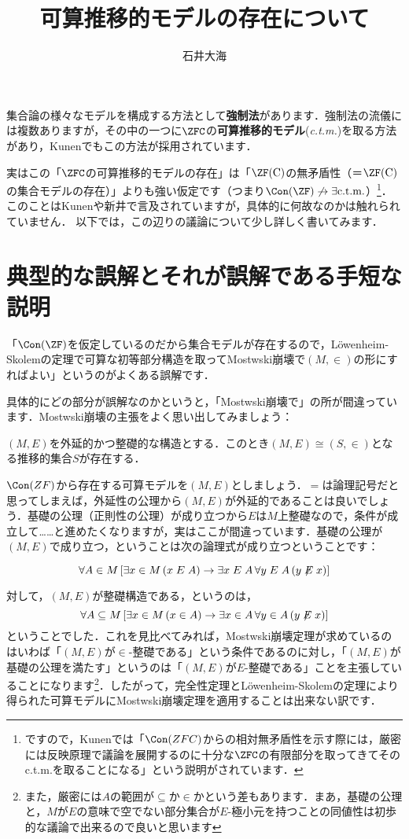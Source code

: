 \documentclass[a4j,uplatex,dvipdfmx]{jsarticle}
\title{可算推移的モデルの存在について}
\author{石井大海}
\begin{document}
\maketitle

集合論の様々なモデルを構成する方法として\textbf{強制法}があります．強制法の流儀には複数ありますが，その中の一つに$\ZFC$の\textbf{可算推移的モデル}(\textit{c.t.m.})を取る方法があり，Kunen\cite{Kunen:2011}でもこの方法が採用されています．

実はこの「$\ZFC$の可算推移的モデルの存在」は「$\ZF(\mathrm{C})$の無矛盾性（＝$\ZF(\mathrm{C})$の集合モデルの存在）」よりも強い仮定です（つまり$\Con(\ZF) \not\rightarrow \exists \text{c.t.m.}$）\footnote{ですので，Kunenでは「$\Con(ZFC)$からの相対無矛盾性を示す際には，厳密には反映原理で議論を展開するのに十分な$\ZFC$の有限部分を取ってきてそのc.t.m.を取ることになる」という説明がされています．}．このことはKunen\cite{Kunen:2011}や新井\cite{Arai:2011}で言及されていますが，具体的に何故なのかは触れられていません．
以下では，この辺りの議論について少し詳しく書いてみます．

\section{典型的な誤解とそれが誤解である手短な説明}
「$\Con(\ZF)$を仮定しているのだから集合モデルが存在するので，L\"{o}wenheim-Skolemの定理で可算な初等部分構造を取ってMostwski崩壊で$(M, \in)$の形にすればよい」というのがよくある誤解です．

具体的にどの部分が誤解なのかというと，「Mostwski崩壊で」の所が間違っています．Mostwski崩壊の主張をよく思い出してみましょう：

\begin{theorem}[Mostwski]
 $(M, E)$を外延的かつ整礎的な構造とする．このとき$(M, E) \cong (S, \in)$となる推移的集合$S$が存在する．
\end{theorem}

$\Con(ZF)$から存在する可算モデルを$(M, E)$としましょう．$=$は論理記号だと思ってしまえば，外延性の公理から$(M, E)$が外延的であることは良いでしょう．基礎の公理（正則性の公理）が成り立つから$E$は$M$上整礎なので，条件が成立して……と進めたくなりますが，実はここが間違っています．基礎の公理が$(M, E)$で成り立つ，ということは次の論理式が成り立つということです：

\[
 \forall A \in M\, [\exists x \in M\,(x \mathrel{E} A) \rightarrow \exists x \mathrel{E} A \, \forall y \mathrel{E} A\, (y \not\mathrel{E} x)]
\]

対して，$(M, E)$が整礎構造である，というのは，
\[
 \forall A \subseteq M\, [\exists x \in M\,(x \in A) \rightarrow \exists x \in A \, \forall y \in A\, (y \not\mathrel{E} x)]
\]
ということでした．これを見比べてみれば，Mostwski崩壊定理が求めているのはいわば「$(M, E)$が$\in$-整礎である」という条件であるのに対し，「$(M, E)$が基礎の公理を満たす」というのは「$(M, E)$が$E$-整礎である」ことを主張していることになります\footnote{また，厳密には$A$の範囲が$\subseteq$か$\in$かという差もあります．まあ，基礎の公理と，$M$が$E$の意味で空でない部分集合が$E$-極小元を持つことの同値性は初歩的な議論で出来るので良いと思います}．したがって，完全性定理とL\"{o}wenheim-Skolemの定理により得られた可算モデルにMostwski崩壊定理を適用することは出来ない訳です．
\end{document}

